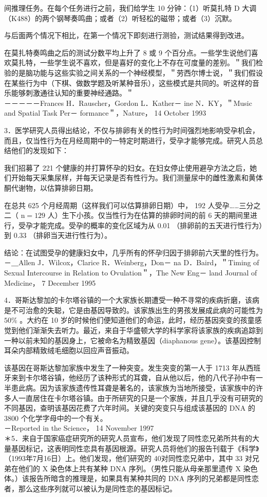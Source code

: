 间推理任务。在每个任务进行之前，我们给学生 10 分钟：（1）听莫扎特 D 大调（K488）的两个钢琴奏鸣曲；或者（2）听轻松的磁带；或者（3）沉默。

与后面两个情况下相比，在第一个情况下即刻进行测验，测试结果得到改进。

在莫扎特奏鸣曲之后的测试分数平均上升了 8 或 9 个百分点。一些学生说他们喜欢莫扎特，一些学生说不喜欢，但是喜好的变化上不存在可度量的差别。＂我们检验的是脑功能与这些实验之间关系的一个神经模型，＂劳西尔博士说，＂我们假设在某些行为中（下棋、做数学题及听某种音乐），这些模式是共同的。听这样的音乐能够刺激通往认知的重要神经通路。＂\\
－－－－－Frances H．Rauscher，Gordon L．Kather－ ine N．KY，＂Music and Spatial Task Per－ formance＂，Nature， 14 October 1993

3．医学研究人员得出结论，不仅与排卵有关的性行为时间强烈地影响受孕机会，而且，仅当性行为在月经周期中的一特定时期进行，受孕才能够完成。研究人员总结他们的发现如下：

我们招募了 221 个健康的并打算怀孕的妇女。在妇女停止使用避孕方法之后，她们开始每天采集尿样，并每天记录是否有性行为。我们测量尿中的雌性激素和黄体酮代谢物，以估算排卵日期。

在总共 625 个月经周期（这样我们可以估算排卵日期）中， 192 人受孕……三分之二（ $\mathrm{n}=129$ 人）生下小孩。仅当性行为在估算的排卵时间的前 6 天的期间里进行，受孕才能完成。受孕的概率的变化区域为从 0.01 （排卵前的五天进行性行为）到 0.33 （排卵当天进行性行为）。

结论：在试图受孕的健康妇女中，几乎所有的怀孕归因于排卵前六天里的性行为。\\
－＿Allen J．Wilcox，Clarice R．Weinberg，Don－ na D．Baird，＂Timing of Sexual Intercourse in Relation to Ovulation＂，The New Eng－ land Journal of Medicine， 7 December 1995

4．哥斯达黎加的卡尔塔谷镇的一个大家族长期遭受一种不寻常的疾病折磨，该病是不可治愈的失聪，它是由基因导致的。该家族出生的男孩发展成此病的可能性为 $50 \%$ 。大约在 10 岁的时候他们便知道他们的命运，此时，经历基因突变的孩童感觉到他们渐渐失去听力。最近，来自于华盛顿大学的科学家将该家族的疾病追踪到一种以前未知的基因身上，它被命名为精致基因（diaphanous gene）。该基因控制耳朵内部精致绒毛细胞以回应声音振动。

该基因在哥斯达黎加家族中发生了一种突变。发生突变的第一人于 1713 年从西班牙来到卡尔塔谷镇，他经历了该种形式的耳聋，自从他以后，他的八代子孙中有一半患此病。因为该家族遗传性耳聋是著名的，该家族为当地所接受，该家族中的许多人一直居住在卡尔塔谷镇。由于所研究的只是一个家族，并且几乎没有可研究的不同基因，查明该基因花费了六年时间。关键的突变只与组成该基因的 DNA 的 3800 个化学字母中的一个有关。\\
－Reported in the Science， 14 November 1997\\
＊5．来自于国家癌症研究所的研究人员宣布，他们发现了同性恋兄弟所共有的大量基因标记，这表明同性恋具有基因根源。研究人员将他们的报告刊载于《科学》（1993年7月16日）上。他们发现，他们研究的 40对同性恋兄弟中，其中 33 对兄弟在他们的 X 染色体上共有某种 DNA 序列。（男性只能从母亲那里遗传 X 染色体。）该报告所暗含的推理是，如果具有某种共同的 DNA 序列的兄弟都是同性恋者，那么这些序列就可以被认为是同性恋的基因标记。

